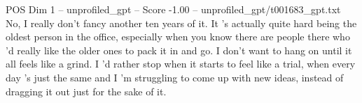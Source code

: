 \begin{textsample}{POS Dim 1 – unprofiled\_gpt – Score -1.00 – unprofiled\_gpt/t001683\_gpt.txt}  \label{ex:f1_pos_022}
No, I really don't fancy another ten years of it.
It ’s actually quite hard being the oldest person in the office, especially when you know there are people there who ’d really like the older ones to pack it in and go.
I don't want to hang on until it all feels like a grind.
I ’d rather stop when it starts to feel like a trial, when every day ’s just the same and I ’m struggling to come up with new ideas, instead of dragging it out just for the sake of it.

\end{textsample}
